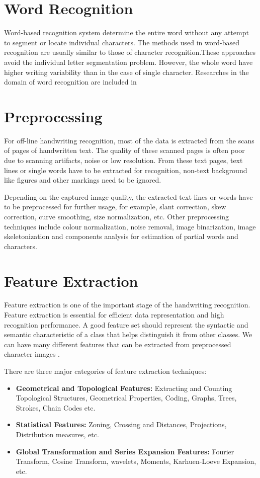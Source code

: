 \section{Word Recognition}\label{section_word_recognition}
Word-based recognition system determine the entire word without any attempt to segment or locate individual characters. The methods used in word-based recognition are usually similar to those of character recognition.These approaches avoid the individual letter segmentation problem. However, the whole word have higher writing variability than in the case of single character. Researches in the domain of word recognition are included in \cite{Bozinovic1989,Vinciarelli2002,Shaw2008}

\section{Preprocessing}\label{section_preprocessing}
For off-line handwriting recognition, most of the data is extracted from the scans of pages of handwritten text. The quality of these scanned pages is often poor due to scanning artifacts, noise or low resolution. From these text pages, text lines or single words have to be extracted for recognition, non-text background like figures and other markings need to be ignored.\par
Depending on the captured image quality, the extracted text lines or words have to be preprocessed for further usage, for example, slant correction, skew correction, curve smoothing, size normalization, etc. Other preprocessing techniques include colour normalization, noise removal, image binarization, image skeletonization and components analysis for estimation of partial words and characters.

\section{Feature Extraction}\label{section_feature_extraction_review}
Feature extraction is one of the important stage of the handwriting recognition. Feature extraction is essential for efficient data representation and high recognition performance. A good feature set should represent the syntactic and semantic characteristic of a class that helps distinguish it from other classes. We can have many different features that can be extracted from preprocessed character images \cite{Jain1996,Jain2000,Zhang2004,Srikrishna2011}.

There are three major categories of feature extraction techniques:
\begin{itemize}
\item \textbf{Geometrical and Topological Features:} Extracting and Counting Topological Structures, Geometrical Properties, Coding, Graphs, Trees, Strokes, Chain Codes etc.
\item \textbf{Statistical Features:} Zoning, Crossing and Distances, Projections, Distribution measures, etc.
\item \textbf{Global Transformation and Series Expansion Features:} Fourier Transform, Cosine Transform,
wavelets, Moments, Karhuen-Loeve Expansion, etc.
\end{itemize}

